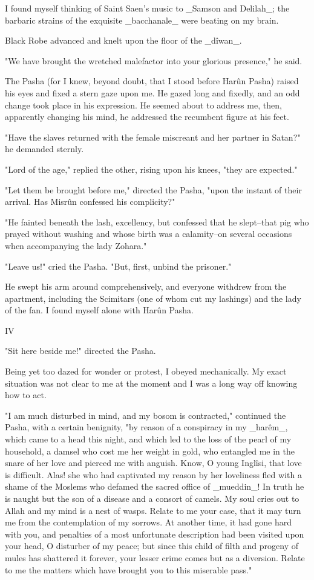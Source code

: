 I found myself thinking of Saint Saen's music to _Samson and Delilah_;
the barbaric strains of the exquisite _bacchanale_ were beating on my
brain.

Black Robe advanced and knelt upon the floor of the _dîwan_.

"We have brought the wretched malefactor into your glorious presence,"
he said.

The Pasha (for I knew, beyond doubt, that I stood before Harûn Pasha)
raised his eyes and fixed a stern gaze upon me. He gazed long and
fixedly, and an odd change took place in his expression. He seemed
about to address me, then, apparently changing his mind, he addressed
the recumbent figure at his feet.

"Have the slaves returned with the female miscreant and her partner in
Satan?" he demanded sternly.

"Lord of the age," replied the other, rising upon his knees, "they are
expected."

"Let them be brought before me," directed the Pasha, "upon the instant
of their arrival. Has Misrûn confessed his complicity?"

"He fainted beneath the lash, excellency, but confessed that he
slept--that pig who prayed without washing and whose birth was a
calamity--on several occasions when accompanying the lady Zohara."

"Leave us!" cried the Pasha. "But, first, unbind the prisoner."

He swept his arm around comprehensively, and everyone withdrew from
the apartment, including the Scimitars (one of whom cut my lashings)
and the lady of the fan. I found myself alone with Harûn Pasha.


IV

"Sit here beside me!" directed the Pasha.

Being yet too dazed for wonder or protest, I obeyed mechanically. My
exact situation was not clear to me at the moment and I was a long way
off knowing how to act.

"I am much disturbed in mind, and my bosom is contracted," continued
the Pasha, with a certain benignity, "by reason of a conspiracy in my
_harêm_, which came to a head this night, and which led to the loss of
the pearl of my household, a damsel who cost me her weight in gold,
who entangled me in the snare of her love and pierced me with anguish.
Know, O young Inglîsi, that love is difficult. Alas! she who had
captivated my reason by her loveliness fled with a shame of the
Moslems who defamed the sacred office of _mueddin_! In truth he is
naught but the son of a disease and a consort of camels. My soul
cries out to Allah and my mind is a nest of wasps. Relate to me your
case, that it may turn me from the contemplation of my sorrows. At
another time, it had gone hard with you, and penalties of a most
unfortunate description had been visited upon your head, O disturber
of my peace; but since this child of filth and progeny of mules has
shattered it forever, your lesser crime comes but as a diversion.
Relate to me the matters which have brought you to this miserable
pass."

